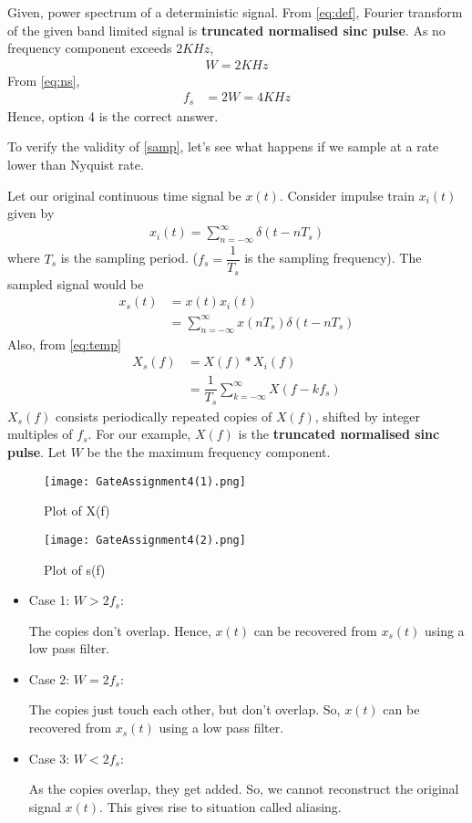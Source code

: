 \documentclass[journal,12pt,twocolumn]{IEEEtran}
\begin{document}
Given, power spectrum of a deterministic signal. From \eqref{eq:def}, Fourier transform of the given band limited signal is \textbf{truncated normalised sinc pulse}. As no frequency component exceeds $2 KHz$,
\begin{align}
    W=2 KHz
\end{align}
From \eqref{eq:ns}, 
\begin{align}
    f_s&=2W=4 KHz
\end{align}
Hence, option 4 is the correct answer.


To verify the validity of \eqref{samp}, let's see what happens if we sample at a rate lower than Nyquist rate.

Let our original continuous time signal be $x(t)$. Consider impulse train $x_i(t)$ given by
\begin{align}
    x_i(t)=\displaystyle\sum_{n=-\infty}^{\infty}\delta(t-nT_s)
\end{align}
where $T_s$ is the sampling period. ($f_s=\dfrac{1}{T_s}$ is the sampling frequency). The sampled signal would be
\begin{align}
    x_s(t)&=x(t)x_i(t)\label{eq:temp}\\
    &=\displaystyle\sum_{n=-\infty}^{\infty}x(nT_s)\delta(t-nT_s)
\end{align}
Also, from \eqref{eq:temp}
\begin{align}
    X_s(f)&=X(f)*X_i(f)\\
    &=\dfrac{1}{T_s}\displaystyle\sum_{k=-\infty}^{\infty}X(f-kf_s)
\end{align}
$X_s(f)$ consists periodically repeated copies of $X(f)$, shifted by integer multiples of $f_s$. For our example, $X(f)$ is the \textbf{truncated normalised sinc pulse}. Let $W$ be the the maximum frequency component. 
\begin{figure}[!h]
 \centering
 \texttt{[image: GateAssignment4(1).png]}
 \caption{Plot of X(f)}
 \label{plot}
 \texttt{[image: GateAssignment4(2).png]}
 \caption{Plot of s(f)}
 \label{plot}
\end{figure}
\begin{itemize}
    \item Case 1: $W>2f_s$: 
    
    The copies don't overlap. Hence, $x(t)$ can be recovered from $x_s(t)$ using a low pass filter.
    \item Case 2: $W=2f_s$: 
    
    The copies just touch each other, but don't overlap. So, $x(t)$ can be recovered from $x_s(t)$ using a low pass filter.
    \item Case 3: $W<2f_s$:
    
    As the copies overlap, they get added. So, we cannot reconstruct the original signal $x(t)$. This gives rise to situation called aliasing.
\end{itemize}
\end{document}
